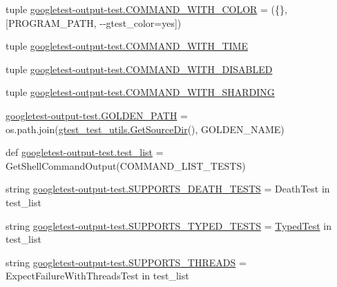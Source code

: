 \begin{DoxyCompactItemize}
\item 
tuple \mbox{\hyperlink{namespacegoogletest-output-test_ab4c3db724c6b581470a94b3118560a02}{googletest-\/output-\/test.\+C\+O\+M\+M\+A\+N\+D\+\_\+\+W\+I\+T\+H\+\_\+\+C\+O\+L\+OR}} = (\{\}, \mbox{[}P\+R\+O\+G\+R\+A\+M\+\_\+\+P\+A\+TH, \textquotesingle{}-\/-\/gtest\+\_\+color=yes\textquotesingle{}\mbox{]})
\item 
tuple \mbox{\hyperlink{namespacegoogletest-output-test_a748a138d54fa2c04f5ac4205ecc0e4e9}{googletest-\/output-\/test.\+C\+O\+M\+M\+A\+N\+D\+\_\+\+W\+I\+T\+H\+\_\+\+T\+I\+ME}}
\item 
tuple \mbox{\hyperlink{namespacegoogletest-output-test_a23aca1c76efbf8895d71a441c77a0225}{googletest-\/output-\/test.\+C\+O\+M\+M\+A\+N\+D\+\_\+\+W\+I\+T\+H\+\_\+\+D\+I\+S\+A\+B\+L\+ED}}
\item 
tuple \mbox{\hyperlink{namespacegoogletest-output-test_a7956407a07f884d3960e956ccb2571a6}{googletest-\/output-\/test.\+C\+O\+M\+M\+A\+N\+D\+\_\+\+W\+I\+T\+H\+\_\+\+S\+H\+A\+R\+D\+I\+NG}}
\item 
\mbox{\hyperlink{namespacegoogletest-output-test_aaf2c3cbfc15d83d986e1e2ba99a94a3e}{googletest-\/output-\/test.\+G\+O\+L\+D\+E\+N\+\_\+\+P\+A\+TH}} = os.\+path.\+join(\mbox{\hyperlink{namespacegtest__test__utils_aaff66cb0980804d8bd57dc719d4b5518}{gtest\+\_\+test\+\_\+utils.\+Get\+Source\+Dir}}(), G\+O\+L\+D\+E\+N\+\_\+\+N\+A\+ME)
\item 
def \mbox{\hyperlink{namespacegoogletest-output-test_aa116be76cb5d1da2469f2811706bf08e}{googletest-\/output-\/test.\+test\+\_\+list}} = Get\+Shell\+Command\+Output(C\+O\+M\+M\+A\+N\+D\+\_\+\+L\+I\+S\+T\+\_\+\+T\+E\+S\+TS)
\item 
string \mbox{\hyperlink{namespacegoogletest-output-test_a3df1558c443e0307fa5a68ec1a698850}{googletest-\/output-\/test.\+S\+U\+P\+P\+O\+R\+T\+S\+\_\+\+D\+E\+A\+T\+H\+\_\+\+T\+E\+S\+TS}} = \textquotesingle{}Death\+Test\textquotesingle{} in test\+\_\+list
\item 
string \mbox{\hyperlink{namespacegoogletest-output-test_a20362e86a65972b4ca1d030daabb0485}{googletest-\/output-\/test.\+S\+U\+P\+P\+O\+R\+T\+S\+\_\+\+T\+Y\+P\+E\+D\+\_\+\+T\+E\+S\+TS}} = \textquotesingle{}\mbox{\hyperlink{classTypedTest}{Typed\+Test}}\textquotesingle{} in test\+\_\+list
\item 
string \mbox{\hyperlink{namespacegoogletest-output-test_a9dd8b32109121ee9ce8a8c42130ca621}{googletest-\/output-\/test.\+S\+U\+P\+P\+O\+R\+T\+S\+\_\+\+T\+H\+R\+E\+A\+DS}} = \textquotesingle{}Expect\+Failure\+With\+Threads\+Test\textquotesingle{} in test\+\_\+list

\end{DoxyCompactItemize}
